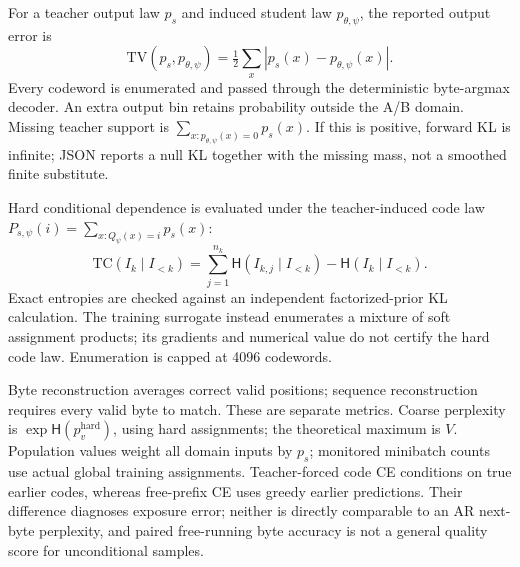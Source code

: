 For a teacher output law \(p_s\) and induced student law
\(p_{\theta,\psi}\), the reported output error is
\begin{equation}
 \mathrm{TV}(p_s,p_{\theta,\psi})=\tfrac12\sum_x|p_s(x)-p_{\theta,\psi}(x)|.
\end{equation}
Every codeword is enumerated and passed through the deterministic byte-argmax
decoder. An extra output bin retains probability outside the A/B domain.
Missing teacher support is \(\sum_{x:p_{\theta,\psi}(x)=0}p_s(x)\).
If this is positive, forward KL is infinite; JSON reports a null KL together
with the missing mass, not a smoothed finite substitute.

Hard conditional dependence is evaluated under the teacher-induced code law
\(P_{s,\psi}(i)=\sum_{x:Q_\psi(x)=i}p_s(x)\):
\begin{equation}
 \mathrm{TC}(I_k\mid I_{<k})=
 \sum_{j=1}^{n_k}\mathsf H(I_{k,j}\mid I_{<k})-
 \mathsf H(I_k\mid I_{<k}).
 \label{eq:tcmetric}
\end{equation}
Exact entropies are checked against an independent factorized-prior KL
calculation. The training surrogate instead enumerates a mixture of soft
assignment products; its gradients and numerical value do not certify the hard
code law. Enumeration is capped at 4096 codewords.

Byte reconstruction averages correct valid positions; sequence reconstruction
requires every valid byte to match. These are separate metrics. Coarse
perplexity is \(\exp\mathsf H(p_v^{\mathrm{hard}})\), using hard assignments;
the theoretical maximum is \(V\). Population values weight all domain inputs by
\(p_s\); monitored minibatch counts use actual global training assignments.
Teacher-forced code CE conditions on true earlier codes, whereas free-prefix
CE uses greedy earlier predictions. Their difference diagnoses exposure error;
neither is directly comparable to an AR next-byte perplexity, and paired
free-running byte accuracy is not a general quality score for unconditional
samples.
